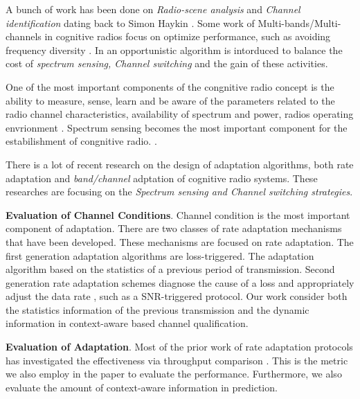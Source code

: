 A bunch of work has been done on \emph{Radio-scene analysis} and \emph{Channel identification} dating back to Simon Haykin \cite{haykin2005cognitive}.
Some work of Multi-bands/Multi-channels in
cognitive radios focus on optimize performance, such as avoiding frequency diversity \cite{rahul2009frequency}. 
In \cite{OAR} an opportunistic algorithm is intorduced to balance the cost of \emph{spectrum sensing, Channel switching} and the gain of these activities.


One of the most important components of the congnitive radio concept is the ability to measure, sense, learn and be aware of the parameters related to the radio channel characteristics, availability of spectrum and power, radios operating envrionment \cite{yucek2009survey}. Spectrum sensing becomes the most important component for the estabilishment of congnitive radio. \cite{yucek2009survey}. 





There is a lot of recent research on the design of adaptation algorithms, both rate adaptation and \emph{band/channel} adptation of cognitive radio systems. These researches are focusing on the \emph{Spectrum sensing and Channel switching strategies}.

\textbf{Evaluation of Channel Conditions}. Channel condition is the most important component of adaptation. 
There are two classes of rate adaptation mechanisms that have been developed. 
These mechanisms are focused on rate adaptation. The first generation adaptation algorithms are loss-triggered. The adaptation algorithm based on the statistics of a previous period of transmission. 
Second generation rate adaptation schemes diagnose the cause of a loss and appropriately adjust the data rate \cite{biaz2008rate, camp2010modulation}, such as a SNR-triggered protocol. 
Our work consider both the statistics information of the previous transmission and the dynamic information in context-aware based channel qualification.

\textbf{Evaluation of Adaptation}. Most of the prior work of rate adaptation protocols has investigated the effectiveness via throughput comparison \cite{camp2010modulation}. This is the metric we also employ in the paper to evaluate the performance. Furthermore, we also evaluate the amount of context-aware information in prediction.
 
